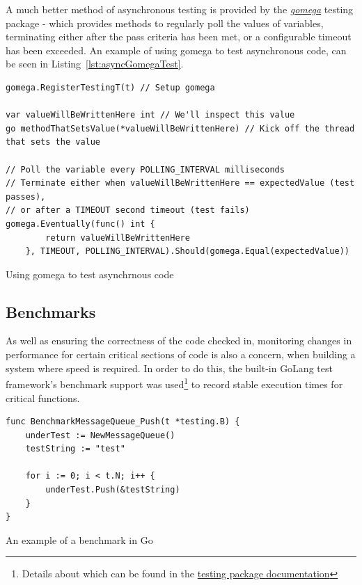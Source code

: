 A much better method of asynchronous testing is provided by the
\href{https://github.com/onsi/gomega}{\emph{gomega}} testing package - which
provides methods to regularly poll the values of variables, terminating either
after the pass criteria has been met, or a configurable timeout has been
exceeded. An example of using gomega to test asynchronous code, can be seen in
Listing~\ref{lst:asyncGomegaTest}.

\begin{listing}[H]
  \centering
  \begin{verbatim}
gomega.RegisterTestingT(t) // Setup gomega

var valueWillBeWrittenHere int // We'll inspect this value
go methodThatSetsValue(*valueWillBeWrittenHere) // Kick off the thread that sets the value

// Poll the variable every POLLING_INTERVAL milliseconds
// Terminate either when valueWillBeWrittenHere == expectedValue (test passes),
// or after a TIMEOUT second timeout (test fails)
gomega.Eventually(func() int {
		return valueWillBeWrittenHere
	}, TIMEOUT, POLLING_INTERVAL).Should(gomega.Equal(expectedValue))
  \end{verbatim}
  \caption{Using gomega to test asynchrnous code}
  \label{lst:asyncGomegaTest}
\end{listing}

\subsection{Benchmarks}
\label{sub:benchmarks}

As well as ensuring the correctness of the code checked in, monitoring changes
in performance for certain critical sections of code is also a concern, when
building a system where speed is required. In order to do this, the built-in
GoLang test framework's benchmark support was used\footnote{Details about which
can be found in the \href{https://golang.org/pkg/testing/}{testing package
documentation}} to record stable execution times for critical functions.

\begin{listing}
  \centering
  \begin{verbatim}
func BenchmarkMessageQueue_Push(t *testing.B) {
	underTest := NewMessageQueue()
	testString := "test"

	for i := 0; i < t.N; i++ {
		underTest.Push(&testString)
	}
}
  \end{verbatim}
  \caption{An example of a benchmark in Go}
  \label{lst:goBenchmark}
\end{listing}

